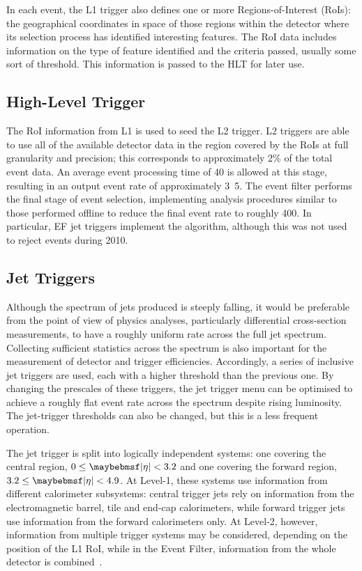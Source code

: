 In each event, the L1 trigger also defines one or more Regions-of-Interest (RoIs):
the geographical coordinates in \etaphi space of those regions within the
detector where its selection process has identified interesting features. The
RoI data includes information on the type of feature identified and the criteria
passed, usually some sort of threshold. This information is passed to the HLT
for later use.

\subsection{High-Level Trigger}
The RoI information from L1 is used to seed the L2 trigger. L2 triggers are able
to use all of the available detector data in the region covered by the RoIs at
full granularity and precision; this corresponds to approximately 2\% of the
total event data. An average event processing time of \unit{40}{\milli\second}
is allowed at this stage, resulting in an output event rate of approximately
\unit{3.5}{\kHz}. The event filter performs the final stage of event selection,
implementing analysis procedures similar to those performed offline to reduce
the final event rate to roughly \unit{400}{\Hz}. In particular, EF jet triggers
implement the \akt algorithm, although this was not used to reject events during
2010.

\subsection{Jet Triggers}
Although the spectrum of jets produced is steeply falling, it would be
preferable from the point of view of physics analyses, particularly differential
cross-section measurements, to have a roughly uniform rate across the full jet
\ET spectrum. Collecting sufficient statistics across the spectrum is also
important for the measurement of detector and trigger efficiencies. Accordingly,
a series of inclusive jet triggers are used, each with a higher threshold than
the previous one. By changing the prescales of these triggers, the jet trigger
menu can be optimised to achieve a roughly flat event rate across the \ET
spectrum despite rising luminosity. The jet-trigger thresholds can also be
changed, but this is a less frequent operation.

The jet trigger is split into logically independent systems: one covering the
central region, $0 \leq \absEta < 3.2$ and one covering the forward region,
$3.2 \leq \absEta <4.9$. At Level-1, these systems use information from
different calorimeter subsystems: central trigger jets rely on information from
the electromagnetic barrel, tile and end-cap calorimeters, while forward trigger
jets use information from the forward calorimeters only. At Level-2, however, information
from multiple trigger systems may be considered, depending on the position of the
L1 RoI, while in the Event Filter, information from the whole detector is
combined~\cite{ATLAS-CONF-2010-028}.

